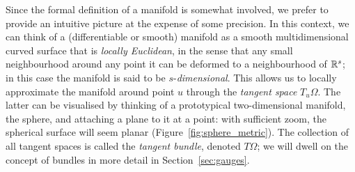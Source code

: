 Since the formal definition of a manifold is somewhat involved, we 
prefer to provide an intuitive picture at the expense of some precision. 
%
In this context, we can think of a (differentiable or smooth) manifold as a smooth multidimensional curved surface %
that is \emph{locally Euclidean}, in the sense that any small neighbourhood around any point it can be deformed
to a neighbourhood of $\mathbb{R}^s$; 
%
in this case the manifold is said to be $s$-{\em dimensional}. 
%
%
%
This allows us to 
locally approximate the manifold around point $u$ through the \emph{tangent space} $T_u\Omega$.  %
The latter can be visualised by thinking of a prototypical two-dimensional manifold, the sphere, and attaching a plane to it at a point: with sufficient zoom, the spherical surface will seem planar (Figure~\ref{fig:sphere_metric}). 
%
 The collection of all tangent spaces is called the {\em tangent bundle}, denoted $T\Omega$; we will dwell on the concept of bundles in more detail in Section~\ref{sec:gauges}. 



